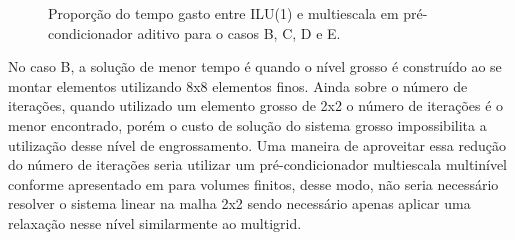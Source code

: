 \begin{figure}[h]
\center
{}
\qquad
{}
\qquad
{}
\caption{Proporção do tempo gasto entre ILU(1) e multiescala em pré-condicionador aditivo para o casos B, C, D e E.  }
\label{fig:proporcaoPrecondicionador}
\end{figure}


No caso B, a solução de menor tempo é quando o nível grosso é construído ao se montar elementos utilizando 8x8 elementos finos. Ainda sobre o número de iterações, quando utilizado um elemento grosso de 2x2 o número de iterações é o menor encontrado, porém o custo de solução do sistema grosso impossibilita a utilização desse nível de engrossamento. Uma maneira de aproveitar essa redução do número de iterações seria utilizar um pré-condicionador multiescala multinível conforme apresentado em \cite{multilevel} para volumes finitos, desse modo, não seria necessário resolver o sistema linear na malha 2x2 sendo necessário apenas aplicar uma relaxação nesse nível similarmente ao multigrid.

